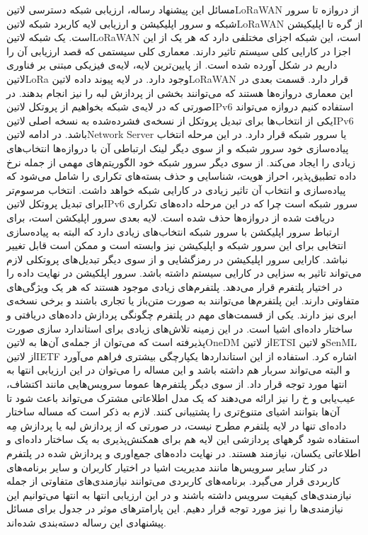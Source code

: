 

مسائل این پیشنهاد رساله، ارزیابی شبکه دسترسی ‌لاتین{LoRaWAN} از دروازه تا سرور شبکه و سرور اپلیکیشن و ارزیابی لایه کاربرد شبکه ‌لاتین{LoRaWAN} از گره تا اپلیکیشن است.
یک شبکه ‌لاتین{LoRaWAN} است، این شبکه اجزای مختلفی دارد که هر یک از این اجزا در کارایی کلی سیستم تاثیر دارند.
معماری کلی سیستمی که قصد ارزیابی آن را داریم در شکل  آورده شده است.
از پایین‌ترین لایه، لایه‌ی فیزیکی مبتنی بر فناوری ‌لاتین{LoRa} وجود دارد.
در لایه پیوند داده ‌لاتین{LoRaWAN} قرار دارد.
قسمت بعدی در این معماری دروازه‌ها هستند که می‌توانند بخشی از پردازش لبه را نیز انجام بدهند. در صورتی که در لایه‌ی شبکه بخواهیم از پروتکل ‌لاتین{IPv6} استفاده کنیم
دروازه می‌تواند یکی از انتخاب‌ها برای تبدیل پروتکل از نسخه‌ی فشرده‌شده به نسخه اصلی ‌لاتین{IPv6} باشد.
در ادامه ‌لاتین{Network Server} یا سرور شبکه قرار دارد. در این مرحله انتخاب پیاده‌سازی خود سرور شبکه و از سوی دیگر لینک ارتباطی آن با
دروازه‌ها انتخاب‌های زیادی را ایجاد می‌کند. از سوی دیگر سرور شبکه خود الگوریتم‌های مهمی از جمله نرخ داده تطبیق‌پذیر، احراز هویت، شناسایی و حذف بسته‌های تکراری را شامل می‌شود
که پیاده‌سازی و انتخاب آن تاثیر زیادی در کارایی شبکه خواهد داشت. انتخاب مرسوم‌تر برای تبدیل پروتکل ‌لاتین{IPv6} سرور شبکه است چرا که در این مرحله داده‌های تکراری دریافت شده از
دروازه‌ها حذف شده است.
لایه بعدی سرور اپلیکشن است، برای ارتباط سرور اپلیکشن با سرور شبکه انتخاب‌های زیادی دارد که البته به پیاده‌سازی انتخابی برای این سرور شبکه و اپلیکیشن نیز وابسته است
و ممکن است قابل تغییر نباشد. کارایی سرور اپلیکیشن در رمزگشایی و از سوی دیگر تبدیل‌های پروتکلی لازم می‌تواند تاثیر به سزایی در کارایی سیستم داشته باشد.
سرور اپلکیشن در نهایت داده را در اختیار پلتفرم قرار می‌دهد. پلتفرم‌های زیادی موجود هستند که هر یک ویژگی‌های متفاوتی دارند.
این پلتفرم‌ها می‌توانند به صورت متن‌باز یا تجاری باشند و برخی نسخه‌ی ابری نیز دارند.
یکی از قسمت‌های مهم
در پلتفرم چگونگی پردازش داده‌های دریافتی و ساختار داده‌ای اشیا است. در این زمینه تلاش‌های زیادی برای استاندارد سازی صورت پذیرفته است که می‌توان از
جمله‌ی آن‌ها به ‌لاتین{OneDM} از ‌لاتین{ETSI} و ‌لاتین{SenML} از ‌لاتین{IETF} اشاره کرد. استفاده از این استانداردها یکپارچگی
بیشتری فراهم می‌آورد و البته می‌تواند سربار هم داشته باشد و این مساله را می‌توان در این ارزیابی انتها به انتها مورد توجه قرار داد.
از سوی دیگر پلتفرم‌ها عموما سرویس‌هایی مانند اکتشاف، عیب‌یابی و ‌خ را نیز ارائه می‌دهند که یک مدل اطلاعاتی مشترک می‌تواند باعث شود تا آن‌ها
بتوانند اشیای متنوع‌تری را پشتیبانی کنند.
لازم به ذکر است که مساله ساختار داده‌ای تنها در لایه پلتفرم مطرح نیست، در صورتی که از پردازش لبه یا پردازش مِه استفاده شود گرههای پردازشی این لایه
هم برای همکنش‌پذیری به یک ساختار داده‌ای و اطلاعاتی یکسان، نیازمند هستند.
در نهایت داده‌های جمع‌اوری و پردازش شده در پلتفرم در کنار سایر سرویس‌ها مانند مدیریت اشیا در اختیار کاربران و سایر برنامه‌های کاربردی قرار می‌گیرد.
برنامه‌های کاربردی می‌توانند نیازمندی‌های متفاوتی از جمله نیازمندی‌های کیفیت سرویس داشته باشند و در این ارزیابی انتها به انتها می‌توانیم این نیازمندی‌ها را
نیز مورد توجه قرار دهیم.
این پارامترهای موثر در جدول  برای مسائل پیشنهادی این رساله دسته‌بندی شده‌اند.

